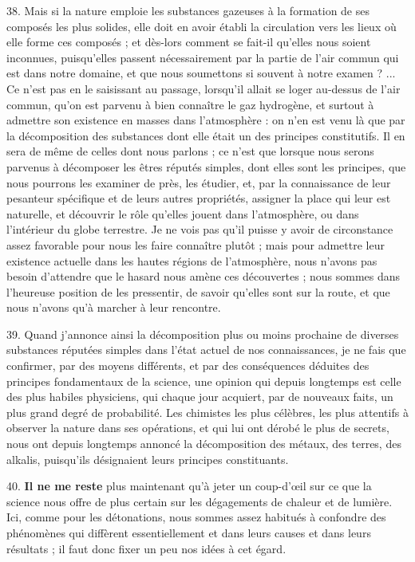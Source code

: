\documentclass[a4paper, 11pt, oneside, polutonikogreek, french]{article}
\begin{document}
38. Mais si la nature emploie les substances gazeuses à la formation de ses composés les plus solides, elle doit en avoir établi la circulation vers les lieux où elle forme ces composés ; et dès-lors comment se fait-il qu'elles nous soient inconnues, puisqu'elles passent nécessairement par la partie de l'air commun qui est dans notre domaine, et que nous soumettons si souvent à notre examen ? ... Ce n'est pas en le saisissant au passage, lorsqu'il allait se loger au-dessus de l'air commun, qu'on est parvenu à bien connaître le gaz hydrogène, et surtout à admettre son existence en masses dans l'atmosphère : on n'en est venu là que par la décomposition des substances dont elle était un des principes constitutifs. Il en sera de même de celles dont nous parlons ; ce n'est que lorsque nous serons parvenus à décomposer les êtres réputés simples, dont elles sont les principes, que nous pourrons les examiner de près, les étudier, et, par la connaissance de leur pesanteur spécifique et de leurs autres propriétés, assigner la place qui leur est naturelle, et découvrir le rôle qu'elles jouent dans l'atmosphère, ou dans l'intérieur du globe terrestre. Je ne vois pas qu'il puisse y avoir de circonstance assez favorable pour nous les faire connaître plutôt ; mais pour admettre leur existence actuelle dans les hautes régions de l'atmosphère, nous n'avons pas besoin d'attendre que le hasard nous amène ces découvertes ; nous sommes dans l'heureuse position de les pressentir, de savoir qu'elles sont sur la route, et que nous n'avons qu'à marcher à leur rencontre.

39. Quand j'annonce ainsi la décomposition plus ou moins prochaine de diverses substances réputées simples dans l'état actuel de nos connaissances, je ne fais que confirmer, par des moyens différents, et par des conséquences déduites des principes fondamentaux de la science, une opinion qui depuis longtemps est celle des plus habiles physiciens, qui chaque jour acquiert, par de nouveaux faits, un plus grand degré de probabilité. Les chimistes les plus célèbres, les plus attentifs à observer la nature dans ses opérations, et qui lui ont dérobé le plus de secrets, nous ont depuis longtemps annoncé la décomposition des métaux, des terres, des alkalis, puisqu'ils désignaient leurs principes constituants.

40. \textbf{Il ne me reste} plus maintenant qu'à jeter un coup-d'œil sur ce que la science nous offre de plus certain sur les dégagements de chaleur et de lumière. Ici, comme pour les détonations, nous sommes assez habitués à confondre des phénomènes qui diffèrent essentiellement et dans leurs causes et dans leurs résultats ; il faut donc fixer un peu nos idées à cet égard.
\end{document}
